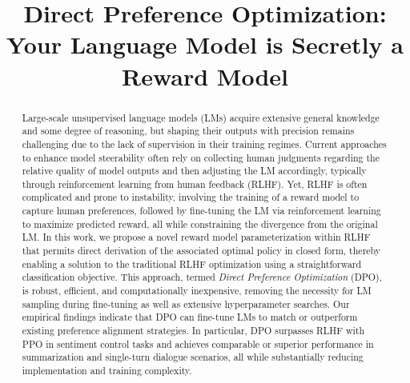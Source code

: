 \title{Direct Preference Optimization: Your Language Model is Secretly a Reward Model}

\begin{abstract}
Large-scale unsupervised language models (LMs) acquire extensive general knowledge and some degree of reasoning, but shaping their outputs with precision remains challenging due to the lack of supervision in their training regimes. Current approaches to enhance model steerability often rely on collecting human judgments regarding the relative quality of model outputs and then adjusting the LM accordingly, typically through reinforcement learning from human feedback (RLHF). Yet, RLHF is often complicated and prone to instability, involving the training of a reward model to capture human preferences, followed by fine-tuning the LM via reinforcement learning to maximize predicted reward, all while constraining the divergence from the original LM. In this work, we propose a novel reward model parameterization within RLHF that permits direct derivation of the associated optimal policy in closed form, thereby enabling a solution to the traditional RLHF optimization using a straightforward classification objective. This approach, termed \textit{Direct Preference Optimization} (DPO), is robust, efficient, and computationally inexpensive, removing the necessity for LM sampling during fine-tuning as well as extensive hyperparameter searches. Our empirical findings indicate that DPO can fine-tune LMs to match or outperform existing preference alignment strategies. In particular, DPO surpasses RLHF with PPO in sentiment control tasks and achieves comparable or superior performance in summarization and single-turn dialogue scenarios, all while substantially reducing implementation and training complexity.
\end{abstract}

